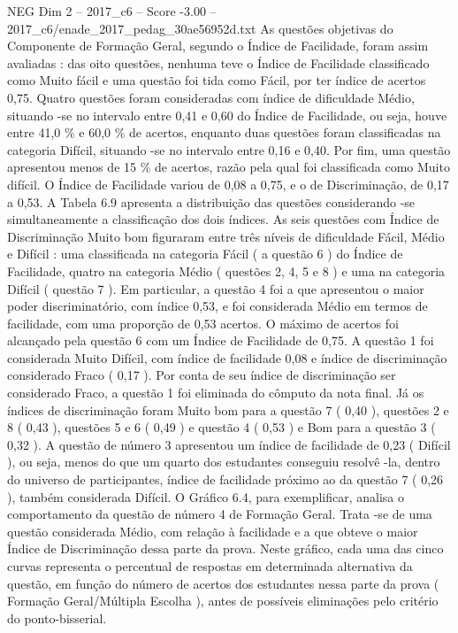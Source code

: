 \begin{textsample}{NEG Dim 2 – 2017\_c6 – Score -3.00 – 2017\_c6/enade\_2017\_pedag\_30ae56952d.txt}
As questões objetivas do Componente de Formação Geral, segundo o Índice de Facilidade, foram assim avaliadas : das oito questões, nenhuma teve o Índice de Facilidade classificado como Muito fácil e uma questão foi tida como Fácil, por ter índice de acertos 0,75.
Quatro questões foram consideradas com índice de dificuldade Médio, situando -se no intervalo entre 0,41 e 0,60 do Índice de Facilidade, ou seja, houve entre 41,0 \% e 60,0 \% de acertos, enquanto duas questões foram classificadas na categoria Difícil, situando -se no intervalo entre 0,16 e 0,40.
Por fim, uma questão apresentou menos de 15 \% de acertos, razão pela qual foi classificada como Muito difícil.
O Índice de Facilidade variou de 0,08 a 0,75, e o de Discriminação, de 0,17 a 0,53.
A Tabela 6.9 apresenta a distribuição das questões considerando -se simultaneamente a classificação dos dois índices.
As seis questões com Índice de Discriminação Muito bom figuraram entre três níveis de dificuldade Fácil, Médio e Difícil : uma classificada na categoria Fácil ( a questão 6 ) do Índice de Facilidade, quatro na categoria Médio ( questões 2, 4, 5 e 8 ) e uma na categoria Difícil ( questão 7 ).
Em particular, a questão 4 foi a que apresentou o maior poder discriminatório, com índice 0,53, e foi considerada Médio em termos de facilidade, com uma proporção de 0,53 acertos.
O máximo de acertos foi alcançado pela questão 6 com um Índice de Facilidade de 0,75.
A questão 1 foi considerada Muito Difícil, com índice de facilidade 0,08 e índice de discriminação considerado Fraco ( 0,17 ).
Por conta de seu índice de discriminação ser considerado Fraco, a questão 1 foi eliminada do cômputo da nota final.
Já os índices de discriminação foram Muito bom para a questão 7 ( 0,40 ), questões 2 e 8 ( 0,43 ), questões 5 e 6 ( 0,49 ) e questão 4 ( 0,53 ) e Bom para a questão 3 ( 0,32 ).
A questão de número 3 apresentou um índice de facilidade de 0,23 ( Difícil ), ou seja, menos do que um quarto dos estudantes conseguiu resolvê -la, dentro do universo de participantes, índice de facilidade próximo ao da questão 7 ( 0,26 ), também considerada Difícil.
O Gráfico 6.4, para exemplificar, analisa o comportamento da questão de número 4 de Formação Geral.
Trata -se de uma questão considerada Médio, com relação à facilidade e a que obteve o maior Índice de Discriminação dessa parte da prova.
Neste gráfico, cada uma das cinco curvas representa o percentual de respostas em determinada alternativa da questão, em função do número de acertos dos estudantes nessa parte da prova ( Formação Geral/Múltipla Escolha ), antes de possíveis eliminações pelo critério do ponto-bisserial.

\end{textsample}
